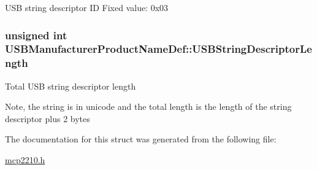 \-U\-S\-B string descriptor \-I\-D \-Fixed value\-: 0x03 \hypertarget{struct_u_s_b_manufacturer_product_name_def_a652bd4d49243f3af5c11683e71f602b5}{
\subsubsection[{\-U\-S\-B\-String\-Descriptor\-Length}]{\setlength{\rightskip}{0pt plus 5cm}unsigned int {\bf \-U\-S\-B\-Manufacturer\-Product\-Name\-Def\-::\-U\-S\-B\-String\-Descriptor\-Length}}}\label{struct_u_s_b_manufacturer_product_name_def_a652bd4d49243f3af5c11683e71f602b5}
\-Total \-U\-S\-B string descriptor length

\-Note, the string is in unicode and the total length is the length of the string descriptor plus 2 bytes 

\-The documentation for this struct was generated from the following file\-:\begin{DoxyCompactItemize}
\item 
\hyperlink{mcp2210_8h}{mcp2210.\-h}\end{DoxyCompactItemize}
